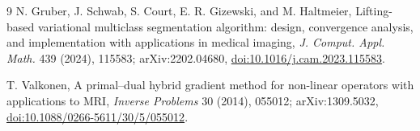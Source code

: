 \documentclass[11pt]{article}
\begin{document}
\begin{thebibliography}{9}
N. Gruber, J. Schwab, S. Court, E. R. Gizewski, and M. Haltmeier,
\newblock Lifting-based variational multiclass segmentation algorithm:
design, convergence analysis, and implementation with applications in medical
imaging,
\newblock \emph{J. Comput. Appl. Math.} 439 (2024), 115583;
arXiv:2202.04680,
\href{https://doi.org/10.1016/j.cam.2023.115583}{doi:10.1016/j.cam.2023.115583}.

T. Valkonen,
\newblock A primal--dual hybrid gradient method for non-linear operators with
applications to MRI,
\newblock \emph{Inverse Problems} 30 (2014), 055012;
arXiv:1309.5032,
\href{https://doi.org/10.1088/0266-5611/30/5/055012}{doi:10.1088/0266-5611/30/5/055012}.
\end{thebibliography}
\end{document}
